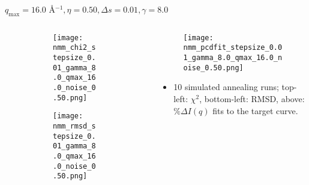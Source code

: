 \documentclass{beamer}
\begin{document}
\begin{frame}{$ q_{\textrm{max}}=16.0 $ \AA $^{-1}, \eta=0.50, \Delta s=0.01, \gamma=8.0$}
	\begin{columns}
		\begin{column}{.5\textwidth}
			\begin{figure}[H]
			\centering
			\begin{subfigure}[b]{\textwidth}
				\centering
				\texttt{[image: nmm\_chi2\_stepsize\_0.01\_gamma\_8.0\_qmax\_16.0\_noise\_0.50.png]}
				\label{fig:}
			\end{subfigure}
			\begin{subfigure}[b]{\textwidth}
				\centering
				\texttt{[image: nmm\_rmsd\_stepsize\_0.01\_gamma\_8.0\_qmax\_16.0\_noise\_0.50.png]}
				\label{fig:}
			\end{subfigure}
			\end{figure}
		\end{column}
		\begin{column}{.5\textwidth}
			\begin{figure}[H]
				\centering
				\texttt{[image: nmm\_pcdfit\_stepsize\_0.01\_gamma\_8.0\_qmax\_16.0\_noise\_0.50.png]}
				\label{fig:}
			\end{figure}
			\begin{itemize}
				\item 10 simulated annealing runs; top-left: $\chi^2$, bottom-left: RMSD, above: $\%\Delta I(q)$ fits to the target curve.
			\end{itemize}
		\end{column}
	\end{columns}
\end{frame}
 
\end{document}
